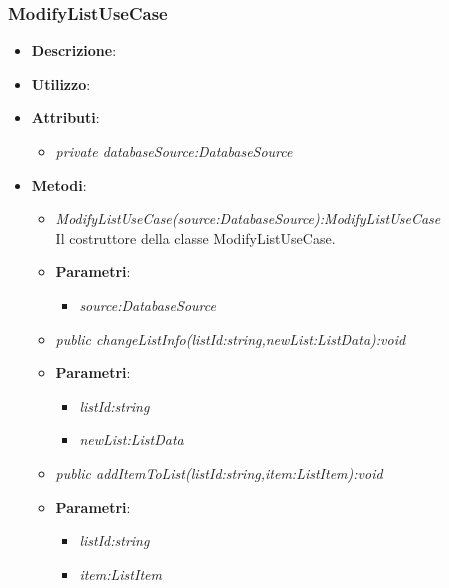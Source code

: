\subsubsection{ModifyListUseCase}
\begin{itemize}
\item \textbf{Descrizione}: 
\item \textbf{Utilizzo}:
\item \textbf{Attributi}: 
	\begin{itemize}
	\item \textit{private databaseSource:DatabaseSource}\\
	
	\end{itemize}
\item \textbf{Metodi}:
	\begin{itemize}
	\item \textit{ModifyListUseCase(source:DatabaseSource):ModifyListUseCase}\\
	Il costruttore della classe ModifyListUseCase.
			\item{\textbf{Parametri}: \begin{itemize}
			\item \textit{source:DatabaseSource}\\

			\end{itemize}}
	\item \textit{public changeListInfo(listId:string,newList:ListData):void}\\
	
			\item{\textbf{Parametri}: \begin{itemize}
			\item \textit{listId:string}\\

			\item \textit{newList:ListData}\\
			
			\end{itemize}}
	\item \textit{public addItemToList(listId:string,item:ListItem):void}\\
	
			\item{\textbf{Parametri}: \begin{itemize}
			\item \textit{listId:string}\\

			\item \textit{item:ListItem}\\
			

\end{itemize}}
\end{itemize}
\end{itemize}
